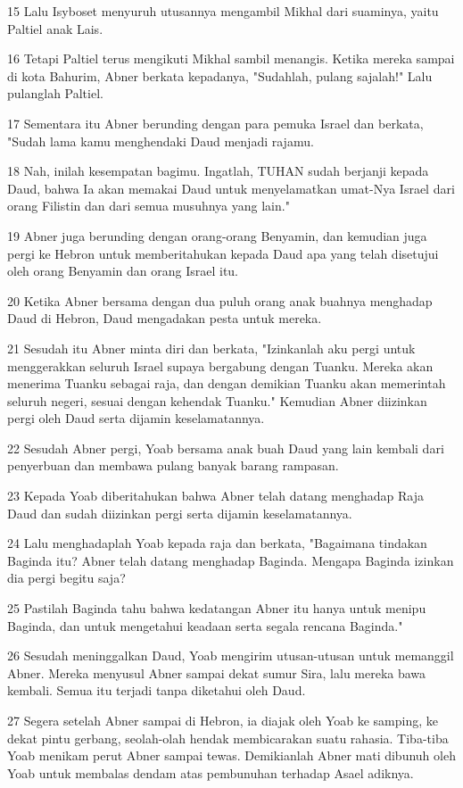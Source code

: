 \par 15 Lalu Isyboset menyuruh utusannya mengambil Mikhal dari suaminya, yaitu Paltiel anak Lais.
\par 16 Tetapi Paltiel terus mengikuti Mikhal sambil menangis. Ketika mereka sampai di kota Bahurim, Abner berkata kepadanya, "Sudahlah, pulang sajalah!" Lalu pulanglah Paltiel.
\par 17 Sementara itu Abner berunding dengan para pemuka Israel dan berkata, "Sudah lama kamu menghendaki Daud menjadi rajamu.
\par 18 Nah, inilah kesempatan bagimu. Ingatlah, TUHAN sudah berjanji kepada Daud, bahwa Ia akan memakai Daud untuk menyelamatkan umat-Nya Israel dari orang Filistin dan dari semua musuhnya yang lain."
\par 19 Abner juga berunding dengan orang-orang Benyamin, dan kemudian juga pergi ke Hebron untuk memberitahukan kepada Daud apa yang telah disetujui oleh orang Benyamin dan orang Israel itu.
\par 20 Ketika Abner bersama dengan dua puluh orang anak buahnya menghadap Daud di Hebron, Daud mengadakan pesta untuk mereka.
\par 21 Sesudah itu Abner minta diri dan berkata, "Izinkanlah aku pergi untuk menggerakkan seluruh Israel supaya bergabung dengan Tuanku. Mereka akan menerima Tuanku sebagai raja, dan dengan demikian Tuanku akan memerintah seluruh negeri, sesuai dengan kehendak Tuanku." Kemudian Abner diizinkan pergi oleh Daud serta dijamin keselamatannya.
\par 22 Sesudah Abner pergi, Yoab bersama anak buah Daud yang lain kembali dari penyerbuan dan membawa pulang banyak barang rampasan.
\par 23 Kepada Yoab diberitahukan bahwa Abner telah datang menghadap Raja Daud dan sudah diizinkan pergi serta dijamin keselamatannya.
\par 24 Lalu menghadaplah Yoab kepada raja dan berkata, "Bagaimana tindakan Baginda itu? Abner telah datang menghadap Baginda. Mengapa Baginda izinkan dia pergi begitu saja?
\par 25 Pastilah Baginda tahu bahwa kedatangan Abner itu hanya untuk menipu Baginda, dan untuk mengetahui keadaan serta segala rencana Baginda."
\par 26 Sesudah meninggalkan Daud, Yoab mengirim utusan-utusan untuk memanggil Abner. Mereka menyusul Abner sampai dekat sumur Sira, lalu mereka bawa kembali. Semua itu terjadi tanpa diketahui oleh Daud.
\par 27 Segera setelah Abner sampai di Hebron, ia diajak oleh Yoab ke samping, ke dekat pintu gerbang, seolah-olah hendak membicarakan suatu rahasia. Tiba-tiba Yoab menikam perut Abner sampai tewas. Demikianlah Abner mati dibunuh oleh Yoab untuk membalas dendam atas pembunuhan terhadap Asael adiknya.
